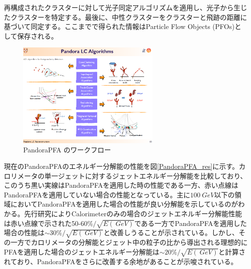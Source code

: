 再構成されたクラスターに対して光子同定アルゴリズムを適用し、光子から生じたクラスターを特定する。最後に、中性クラスターをクラスターと飛跡の距離に基づいて同定する。ここまでで得られた情報はParticle Flow Objects (PFOs)として保存される。

\begin{figure}[b]
	\begin{center}
		\includegraphics[width=200pt]{./Figure/EcalDetector/PandoraPFA_2.png}
		\caption[PandoraPFA のワークフロー]{PandoraPFA のワークフロー}
		\label{PandoraPFA}
	\end{center}
\end{figure}

現在のPandoraPFAのエネルギー分解能の性能を図\ref{PandoraPFA_res}に示す。カロリメータの単一ジェットに対するジェットエネルギー分解能を比較しており、このうち黒い実線はPandoraPFAを適用した時の性能である一方、赤い点線はPandoraPFAを適用していない場合の性能となっている。主に$\SI{100}{GeV}$以下の領域においてPandoraPFAを適用した場合の性能が良い分解能を示しているのがわかる。先行研究によりCalorimeterのみの場合のジェットエネルギー分解能性能は赤い点線で示された50-60\%$/\sqrt{E(\SI{}{GeV})}$である一方でPandoraPFAを適用した場合の性能は$\sim30\%/\sqrt{E(\SI{}{GeV})}$と改善しうることが示されている。しかし、その一方でカロリメータの分解能とジェット中の粒子の比から導出される理想的にPFAを適用した場合のジェットエネルギー分解能は$\sim20\%/\sqrt{E(\SI{}{GeV})}$と計算されており、PandoraPFAをさらに改善する余地があることが示唆されている。

